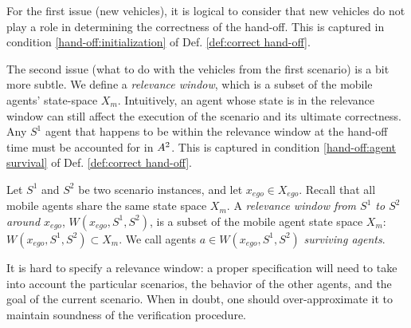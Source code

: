 For the first issue (new vehicles), it is logical to consider that new vehicles do not play a role in determining the correctness of the hand-off. 
This is captured in condition \ref{hand-off:initialization} of Def. \ref{def:correct hand-off}.

The second issue (what to do with the vehicles from the first scenario) is a bit more subtle. 
We define a \emph{relevance window}, which is a subset of the mobile agents' state-space $X_m$.
Intuitively, an agent whose state is in the relevance window can still affect the execution of the scenario and its ultimate correctness.
Any $S^1$ agent that happens to be within the relevance window at the hand-off time must be accounted for in $A^2$. 
This is captured in condition \ref{hand-off:agent survival} of Def. \ref{def:correct hand-off}. 

\begin{defn}
	\label{def:relevance window}
	Let $S^1$ and $S^2$ be two scenario instances,
	and let $x_{ego} \in X_{ego}$.
	Recall that all mobile agents share the same state space $X_m$.
	A \emph{relevance window from $S^1$ to $S^2$ around $x_{ego}$}, $W(x_{ego}, S^1,S^2)$,  is a subset of the mobile agent state space $X_m$: $W(x_{ego}, S^1,S^2) \subset X_m$.
	We call agents $a \in W(x_{ego}, S^1,S^2)$ \emph{surviving agents}.
\end{defn}
It is hard to specify a relevance window: a proper specification will need to take into account the particular scenarios, the behavior of the other agents, and the goal of the current scenario.
When in doubt, one should over-approximate it to maintain soundness of the verification procedure.

